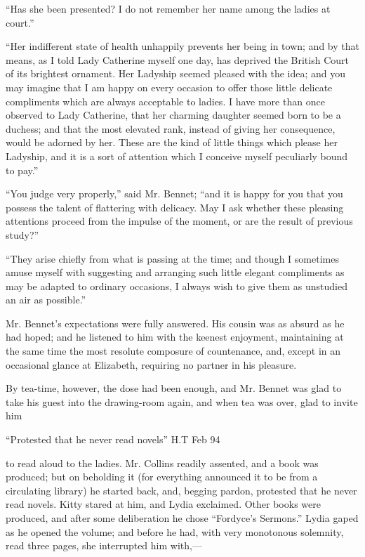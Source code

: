 \documentclass[12pt,openright]{book}
\begin{document}
“Has she been presented? I do not remember her name among the ladies at court.”

“Her indifferent state of health unhappily prevents her being in town; and by that means, as I told Lady Catherine myself one day, has deprived the British Court of its brightest ornament. Her Ladyship seemed pleased with the idea; and you may imagine that I am happy on every occasion to offer those little delicate compliments which are always acceptable to ladies. I have more than once observed to Lady Catherine, that her charming daughter seemed born to be a duchess; and that the most elevated rank, instead of giving her consequence, would be adorned by her. These are the kind of little things which please her Ladyship, and it is a sort of attention which I conceive myself peculiarly bound to pay.”

“You judge very properly,” said Mr. Bennet; “and it is happy for you that you possess the talent of flattering with delicacy. May I ask whether these pleasing attentions proceed from the impulse of the moment, or are the result of previous study?”

“They arise chiefly from what is passing at the time; and though I sometimes amuse myself with suggesting and arranging such little elegant compliments as may be adapted to ordinary occasions, I always wish to give them as unstudied an air as possible.”

Mr. Bennet’s expectations were fully answered. His cousin was as absurd as he had hoped; and he listened to him with the keenest enjoyment, maintaining at the same time the most resolute composure of countenance, and, except in an occasional glance at Elizabeth, requiring no partner in his pleasure.

By tea-time, however, the dose had been enough, and Mr. Bennet was glad to take his guest into the drawing-room again, and when tea was over, glad to invite him

“Protested
that he never read novels” H.T Feb 94


to read aloud to the ladies. Mr. Collins readily assented, and a book was produced; but on beholding it (for everything announced it to be from a circulating library) he started back, and, begging pardon, protested that he never read novels. Kitty stared at him, and Lydia exclaimed. Other books were produced, and after some deliberation he chose “Fordyce’s Sermons.” Lydia gaped as he opened the volume; and before he had, with very monotonous solemnity, read three pages, she interrupted him with,—
\end{document}

